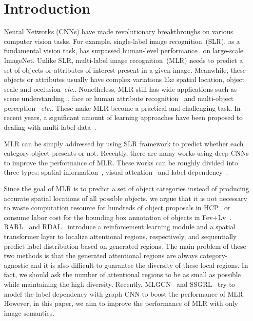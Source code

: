 \documentclass[journal]{IEEEtran}
\makeatletter
\DeclareRobustCommand\onedot{\@onedot}
\def\@onedot{.}
\def\etc{\emph{etc}\onedot}
\makeatother
\begin{document}
\section{Introduction}
 Neural Networks (CNNs) have made revolutionary breakthroughs on various computer vision tasks. For example, single-label image recognition~(SLR), as a fundamental vision task, has surpassed human-level performance~\cite{he2015delving} on large-scale ImageNet. Unlike SLR, multi-label image recognition~(MLR) needs to predict a set of objects or attributes of interest present in a given image. Meanwhile, these objects or attributes usually have complex variations like spatial location, object scale and occlusion~\etc. Nonetheless, MLR still has wide applications such as scene understanding~\cite{shao2015deeply}, face or human attribute recognition~\cite{liu2015deep,li2016human} and multi-object perception~\cite{wei2015hcp} \etc. These make MLR become a practical and challenging task. In recent years, a significant amount of learning approaches have been proposed to dealing with multi-label data~\cite{zhang2013review}.

MLR can be simply addressed by using SLR framework to predict whether each category object presents or not. Recently, there are many works using deep CNNs to improve the performance of MLR. These works can be roughly divided into three types: spatial information~\cite{wei2015hcp,yang2016exploit}, visual attention~\cite{chen2018recurrent,wang2017multi,zhu2017learning,guo2019visual} and label dependency~\cite{wang2016cnn,chen2018order,chen2019multi,chenlearning}. 

Since the goal of MLR is to predict a set of object categories instead of producing accurate spatial locations of all possible objects, we argue that it is not necessary to waste computation resource for hundreds of object proposals in HCP~\cite{wei2015hcp} or consume labor cost for the bounding box annotation of objects in Fev+Lv~\cite{yang2016exploit}. RARL~\cite{chen2018recurrent} and RDAL~\cite{wang2017multi} introduce a reinforcement learning module and a spatial transformer layer to localize attentional regions, respectively, and sequentially predict label distribution based on generated regions. The main problem of these two methods is that the generated attentional regions are always category-agnostic and it is also difficult to guarantee the diversity of these local regions. In fact, we should ask the number of attentional regions to be as small as possible while maintaining the high diversity. Recently, MLGCN~\cite{chen2019multi,chen2021learning} and SSGRL~\cite{chenlearning} try to model the label dependency with graph CNN to boost the performance of MLR. However, in this paper, we aim to improve the performance of MLR with only image semantics.
\end{document}
